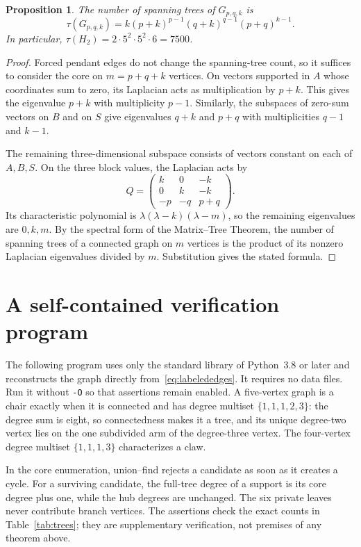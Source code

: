 \documentclass[11pt]{article}
\newtheorem{proposition}[theorem]{Proposition}
\theoremstyle{remark}
\begin{document}
\begin{proposition}\label{prop:treecount}
The number of spanning trees of $G_{p,q,k}$ is
\[
 \tau(G_{p,q,k})=
 k(p+k)^{p-1}(q+k)^{q-1}(p+q)^{k-1}.
\]
In particular, $\tau(H_2)=2\cdot5^2\cdot5^2\cdot6=7500$.
\end{proposition}
\begin{proof}
Forced pendant edges do not change the spanning-tree count, so it suffices to consider the core on $m=p+q+k$ vertices. On vectors supported in $A$ whose coordinates sum to zero, its Laplacian acts as multiplication by $p+k$. This gives the eigenvalue $p+k$ with multiplicity $p-1$. Similarly, the subspaces of zero-sum vectors on $B$ and on $S$ give eigenvalues $q+k$ and $p+q$ with multiplicities $q-1$ and $k-1$.

The remaining three-dimensional subspace consists of vectors constant on each of $A,B,S$. On the three block values, the Laplacian acts by
\[
 Q=\begin{pmatrix}
 k&0&-k\\
 0&k&-k\\
 -p&-q&p+q
 \end{pmatrix}.
\]
Its characteristic polynomial is $\lambda(\lambda-k)(\lambda-m)$, so the remaining eigenvalues are $0,k,m$. By the spectral form of the Matrix--Tree Theorem, the number of spanning trees of a connected graph on $m$ vertices is the product of its nonzero Laplacian eigenvalues divided by $m$. Substitution gives the stated formula.
\end{proof}

\appendix
\section{A self-contained verification program}\label{app:code}

The following program uses only the standard library of Python~3.8 or later and reconstructs the graph directly from~\eqref{eq:labelededges}. It requires no data files. Run it without \texttt{-O} so that assertions remain enabled. A five-vertex graph is a chair exactly when it is connected and has degree multiset $\{1,1,1,2,3\}$: the degree sum is eight, so connectedness makes it a tree, and its unique degree-two vertex lies on the one subdivided arm of the degree-three vertex. The four-vertex degree multiset $\{1,1,1,3\}$ characterizes a claw.

In the core enumeration, union--find rejects a candidate as soon as it creates a cycle. For a surviving candidate, the full-tree degree of a support is its core degree plus one, while the hub degrees are unchanged. The six private leaves never contribute branch vertices. The assertions check the exact counts in Table~\ref{tab:trees}; they are supplementary verification, not premises of any theorem above.
\end{document}
